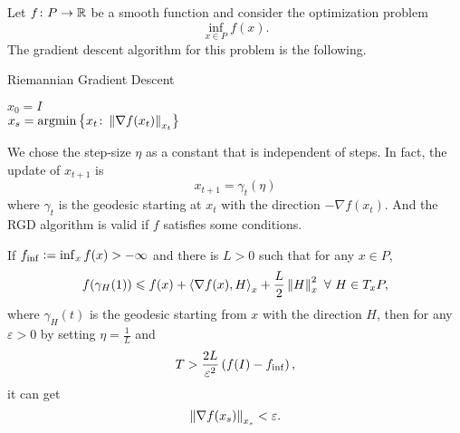 \documentclass[suri,pdfbookmark]{engsuribt} %
\begin{document}
  Let $f \colon P \rightarrow \mathbb{R}$ be a smooth function and consider the optimization problem
  \begin{equation*}
    \inf_{x \in P} f(x).
  \end{equation*}
  The gradient descent algorithm for this problem is the following.
  \begin{center}
    \begin{algorithm}[H]
      \SetAlgoNoLine
      \caption{Riemannian Gradient Descent}
      $x_0 = I$ \\
      $x_s = \operatorname{argmin} \left\{x_t \colon \left\lVert\nabla f(x_t)\right\lVert_{x_t}\right\}$ \\
    \end{algorithm}
  \end{center}
  We chose the step-size $\eta$ as a constant that is independent of steps. In fact, the update of $x_{t+1}$ is
  \begin{equation*}
    x_{t+1} =  \gamma_{t}(\eta)
  \end{equation*}
  where $\gamma_{t}$ is the geodesic starting at $x_t$ with the direction $-\nabla f(x_t)$. And the RGD algorithm is valid if $f$ satisfies some conditions.

  \begin{thm}\label{thm:1}
    If $f_{\inf} \vcentcolon= \inf_x f(x) > -\infty$ and there is $L>0$ such that for any $x \in P$,
    \begin{equation} \label{in:3}
      f(\gamma_H(1)) \leqslant f(x) + \left\langle \nabla f(x),H \right\rangle_x + \frac{L}{2}\left\lVert H\right\lVert_x^2~\forall~H \in T_xP, 
    \end{equation}
    where $\gamma_H(t)$ is the geodesic starting from $x$ with the direction $H$, then for any $\varepsilon > 0$ by setting $\eta = \frac{1}{L}$ and
    \begin{equation*}
      T > \frac{2L}{\varepsilon^2}\left(f(I)-f_{\inf}\right),
    \end{equation*}
    it can get
    \begin{equation*}
      \left\lVert\nabla f(x_s)\right\lVert_{x_s} < \varepsilon.
    \end{equation*}
  \end{thm}
\end{document}

